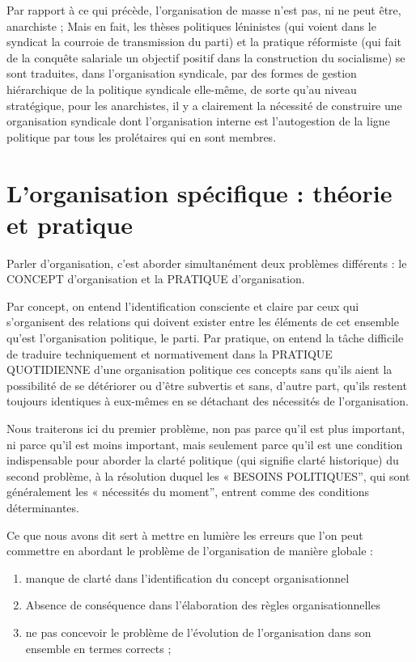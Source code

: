 Par rapport à ce qui précède, l'organisation de masse n'est pas, ni ne peut être, anarchiste ; Mais en fait, les thèses politiques léninistes (qui voient dans le syndicat la courroie de transmission du parti) et la pratique réformiste (qui fait de la conquête salariale un objectif positif dans la construction du socialisme) se sont traduites, dans l'organisation syndicale, par des formes de gestion hiérarchique de la politique syndicale elle-même, de sorte qu'au niveau stratégique, pour les anarchistes, il y a clairement la nécessité de construire une organisation syndicale dont l'organisation interne est l'autogestion de la ligne politique par tous les prolétaires qui en sont membres.

\chapter{L'organisation spécifique : théorie et pratique}\hypertarget{lorganisation-spcifique--thorie-et-pratique}{}\label{lorganisation-spcifique--thorie-et-pratique}

Parler d'organisation, c'est aborder simultanément deux problèmes différents : le CONCEPT d'organisation et la PRATIQUE d'organisation.

Par concept, on entend l'identification consciente et claire par ceux qui s'organisent des relations qui doivent exister entre les éléments de cet ensemble qu'est l'organisation politique, le parti. Par pratique, on entend la tâche difficile de traduire techniquement et normativement dans la PRATIQUE QUOTIDIENNE d'une organisation politique ces concepts sans qu'ils aient la possibilité de se détériorer ou d'être subvertis et sans, d'autre part, qu'ils restent toujours identiques à eux-mêmes en se détachant des nécessités de l'organisation.

Nous traiterons ici du premier problème, non pas parce qu'il est plus important, ni parce qu'il est moins important, mais seulement parce qu'il est une condition indispensable pour aborder la clarté politique (qui signifie clarté historique) du second problème, à la résolution duquel les « BESOINS POLITIQUES'', qui sont généralement les « nécessités du moment'', entrent comme des conditions déterminantes.

Ce que nous avons dit sert à mettre en lumière les erreurs que l'on peut commettre en abordant le problème de l'organisation de manière globale :

\begin{enumerate}
\item{} manque de clarté dans l'identification du concept organisationnel
\item{} Absence de conséquence dans l'élaboration des règles organisationnelles
\item{} ne pas concevoir le problème de l'évolution de l'organisation dans son ensemble en termes corrects ;
\end{enumerate}

